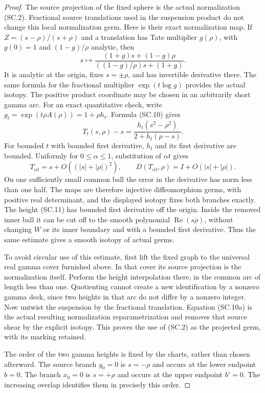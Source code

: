\begin{proof}
The source projection of the fixed sphere is the actual normalization
(SC.2). Fractional source translations used in the suspension product
do not change this local normalization germ. Here is their exact
normalization map. If \(Z=(s-\rho)/(s+\rho)\) and a translation has
Tate multiplier \(g(\rho)\), with \(g(0)=1\) and
\((1-g)/\rho\) analytic, then
\[
 s\longmapsto
 \frac{(1+g)s+(1-g)\rho}
      {((1-g)/\rho)s+(1+g)}.                        \tag{SC.10}
\]
It is analytic at the origin, fixes \(s=\pm\rho\), and has invertible
derivative there. The same formula for the fractional multiplier
\(\exp(t\log g)\) provides the actual isotopy. The positive product
coordinate may be chosen in an arbitrarily short gamma arc. For an exact
quantitative check, write \(g_t=\exp(t\rho A(\rho))=1+\rho h_t\).
Formula (SC.10) gives
\[
 T_t(s,\rho)-s
       =\frac{h_t(s^2-\rho^2)}{2+h_t(\rho-s)}.       \tag{SC.10a}
\]
For bounded \(t\) with bounded first derivative, \(h_t\) and its
first derivative are bounded. Uniformly for \(0\leq\alpha\leq1\),
substitution of \(\alpha t\) gives
\[
 T_{\alpha t}=s+O((|s|+|\rho|)^2),\qquad
 D(T_{\alpha t},\rho)=I+O(|s|+|\rho|).
\]
On one sufficiently small common ball the error in the derivative has
norm less than one half. The maps are therefore injective diffeomorphism
germs, with positive real determinant, and the displayed isotopy fixes
both branches exactly. The height (SC.11) has bounded first derivative
off the origin. Inside the removed inner ball it can be cut off to the
smooth polynomial \(\operatorname{Re}(s\overline\rho)\), without
changing \(W\) or its inner boundary and with a bounded first derivative.
Thus the same estimate gives a smooth isotopy of actual germs.

To avoid circular use of this estimate, first lift the fixed graph to the
universal real gamma cover furnished above. In that cover its source
projection is the normalization itself. Perform the height interpolation
there, in the common arc of length less than one. Quotienting cannot
create a new identification by a nonzero gamma deck, since two heights
in that arc do not differ by a nonzero integer. Now untwist the
suspension by the fractional translation. Equation (SC.10a) is the
actual resulting normalization reparametrization and removes that
source shear by the explicit isotopy. This proves the use of (SC.2)
as the projected germ, with its marking retained.

The order of the two gamma heights is fixed by the charts, rather than
chosen afterward. The source branch \(y_0=0\) is \(s=-\rho\) and
occurs at the lower endpoint \(b=0\). The branch \(x_0=0\) is
\(s=+\rho\) and occurs at the upper endpoint \(b'=0\). The increasing
overlap identifies them in precisely this order.


\end{proof}
